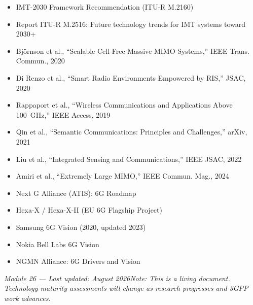 \begin{itemize}
\tightlist
\item
  IMT-2030 Framework Recommendation (ITU-R M.2160)
\item
  Report ITU-R M.2516: Future technology trends for IMT systems toward 2030+
\end{itemize}


\begin{itemize}
\tightlist
\item
  Björnson et al., ``Scalable Cell-Free Massive MIMO Systems,'' IEEE Trans. Commun., 2020
\item
  Di Renzo et al., ``Smart Radio Environments Empowered by RIS,'' JSAC, 2020
\item
  Rappaport et al., ``Wireless Communications and Applications Above 100~GHz,'' IEEE Access, 2019
\item
  Qin et al., ``Semantic Communications: Principles and Challenges,'' arXiv, 2021
\item
  Liu et al., ``Integrated Sensing and Communications,'' IEEE JSAC, 2022
\item
  Amiri et al., ``Extremely Large MIMO,'' IEEE Commun. Mag., 2024
\end{itemize}


\begin{itemize}
\tightlist
\item
  Next G Alliance (ATIS): 6G Roadmap
\item
  Hexa-X /\allowbreak{} Hexa-X-II (EU 6G Flagship Project)
\item
  Samsung 6G Vision (2020, updated 2023)
\item
  Nokia Bell Labs 6G Vision
\item
  NGMN Alliance: 6G Drivers and Vision
\end{itemize}

\emph{Module 26 — Last updated: August 2026}\CNbr{}\emph{Note: This is a living document. Technology maturity assessments will change as research progresses and 3GPP work advances.}
